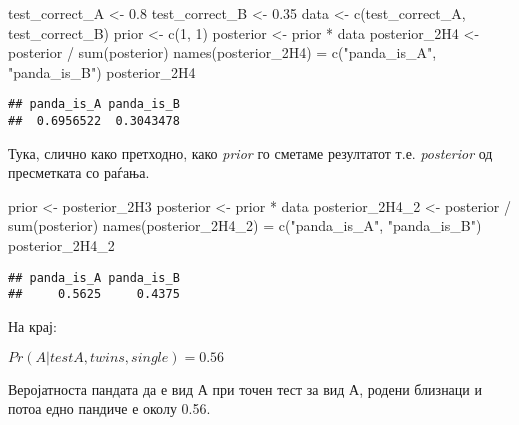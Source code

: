 \documentclass[
]{book}
\newenvironment{Shaded}{\begin{snugshade}}{\end{snugshade}}
\newcommand{\DecValTok}[1]{\textcolor[rgb]{0.00,0.00,0.81}{#1}}
\newcommand{\FloatTok}[1]{\textcolor[rgb]{0.00,0.00,0.81}{#1}}
\newcommand{\FunctionTok}[1]{\textcolor[rgb]{0.00,0.00,0.00}{#1}}
\newcommand{\NormalTok}[1]{#1}
\newcommand{\OtherTok}[1]{\textcolor[rgb]{0.56,0.35,0.01}{#1}}
\newcommand{\SpecialCharTok}[1]{\textcolor[rgb]{0.00,0.00,0.00}{#1}}
\newcommand{\StringTok}[1]{\textcolor[rgb]{0.31,0.60,0.02}{#1}}
\begin{document}
\begin{Shaded}
\begin{Highlighting}[]
\NormalTok{test\_correct\_A }\OtherTok{\textless{}{-}} \FloatTok{0.8}
\NormalTok{test\_correct\_B }\OtherTok{\textless{}{-}} \FloatTok{0.35}
\NormalTok{data }\OtherTok{\textless{}{-}} \FunctionTok{c}\NormalTok{(test\_correct\_A, test\_correct\_B)}
\NormalTok{prior }\OtherTok{\textless{}{-}} \FunctionTok{c}\NormalTok{(}\DecValTok{1}\NormalTok{, }\DecValTok{1}\NormalTok{)}
\NormalTok{posterior }\OtherTok{\textless{}{-}}\NormalTok{ prior }\SpecialCharTok{*}\NormalTok{ data}
\NormalTok{posterior\_2H4 }\OtherTok{\textless{}{-}}\NormalTok{ posterior }\SpecialCharTok{/} \FunctionTok{sum}\NormalTok{(posterior)}
\FunctionTok{names}\NormalTok{(posterior\_2H4) }\OtherTok{=} \FunctionTok{c}\NormalTok{(}\StringTok{"panda\_is\_A"}\NormalTok{, }\StringTok{"panda\_is\_B"}\NormalTok{)}
\NormalTok{posterior\_2H4}
\end{Highlighting}
\end{Shaded}

\begin{verbatim}
## panda_is_A panda_is_B 
##  0.6956522  0.3043478
\end{verbatim}

Тука, слично како претходно, како \emph{prior} го сметаме резултатот т.е. \emph{posterior} од пресметката со раѓања.

\begin{Shaded}
\begin{Highlighting}[]
\NormalTok{prior }\OtherTok{\textless{}{-}}\NormalTok{ posterior\_2H3}
\NormalTok{posterior }\OtherTok{\textless{}{-}}\NormalTok{ prior }\SpecialCharTok{*}\NormalTok{ data}
\NormalTok{posterior\_2H4\_2 }\OtherTok{\textless{}{-}}\NormalTok{ posterior }\SpecialCharTok{/} \FunctionTok{sum}\NormalTok{(posterior)}
\FunctionTok{names}\NormalTok{(posterior\_2H4\_2) }\OtherTok{=} \FunctionTok{c}\NormalTok{(}\StringTok{"panda\_is\_A"}\NormalTok{, }\StringTok{"panda\_is\_B"}\NormalTok{)}
\NormalTok{posterior\_2H4\_2}
\end{Highlighting}
\end{Shaded}

\begin{verbatim}
## panda_is_A panda_is_B 
##     0.5625     0.4375
\end{verbatim}

На крај:

\(Pr(A|testA,twins,single) = 0.56\)

Веројатноста пандата да е вид А при точен тест за вид А, родени близнаци и потоа едно пандиче е околу 0.56.
\end{document}
